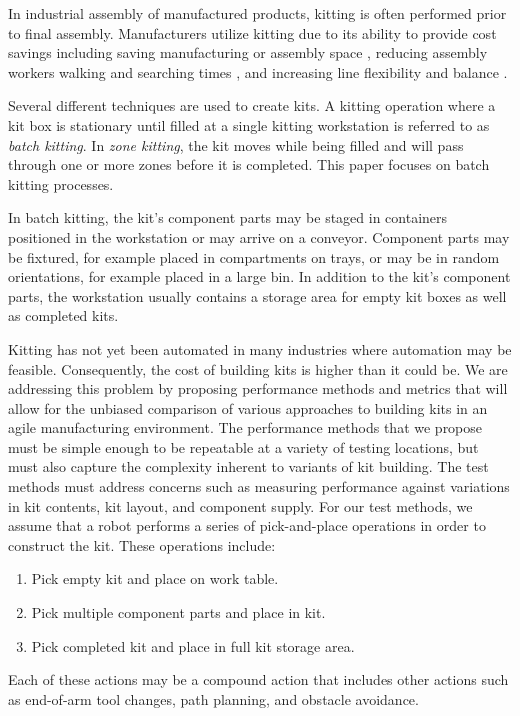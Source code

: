 In industrial assembly of manufactured products, kitting is
often performed prior to final assembly. Manufacturers utilize kitting
due to its ability to provide cost savings \cite{Carlsson_2008}
including saving manufacturing or assembly space \cite{Medbo2003},
reducing assembly workers walking and searching times \cite{Schwind1992},
and increasing line flexibility \cite{Bozer1992} and balance \cite{Jiao2000}.

Several different techniques are used to create kits. A kitting
operation where a kit box is stationary until filled at a single
kitting workstation is referred to as {\it batch kitting}.
In {\it zone kitting}, the kit moves while being filled and will pass through one or
more zones before it is completed. This paper focuses on batch kitting processes.

In batch kitting, the kit's component parts may be staged in
containers positioned in the workstation or may arrive on a conveyor.
Component parts may be fixtured, for example placed in compartments
on trays, or may be in random orientations, for example
placed in a large bin. In addition to the kit's component parts,
the workstation usually contains a storage area for empty kit boxes as
well as completed kits.

Kitting has not yet been automated in many industries where
automation may be feasible. Consequently, the cost of building
kits is higher than it could be. We are addressing this problem
by proposing performance methods and metrics that will allow for
the unbiased comparison of various approaches to building kits
in an agile manufacturing environment. The performance methods
that we propose must be simple enough to be repeatable at a variety of
testing locations, but must also capture the complexity inherent
to variants of kit building. The test methods must address concerns such as
measuring performance against variations in kit contents, kit
layout, and component supply. For our test methods, we assume that
a robot performs a series of pick-and-place operations
in order to construct the kit. These operations include:
\begin{enumerate}
\item Pick empty kit and place on work table.
\item Pick multiple component parts and place in kit.
\item Pick completed kit and place in full kit storage area.
\end{enumerate}
Each of these actions may be a compound action that includes
other actions such as end-of-arm tool changes, path planning,
and obstacle avoidance.

